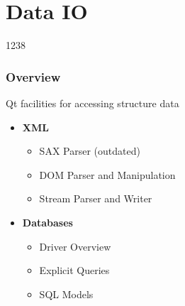 %
%
%
%

\section{Data IO}

\begin{slide}{1238}\label{xml-processing}
\frametitle{Overview}

Qt facilities for accessing structure data

\begin{itemize}
\item \textbf{XML}
  \begin{itemize}
  \item SAX Parser (outdated)
  \item DOM Parser and Manipulation
  \item Stream Parser and Writer
  \end{itemize}
\item \textbf{Databases}
  \begin{itemize}
  \item Driver Overview
  \item Explicit Queries
  \item SQL Models
  \end{itemize}
\end{itemize}
\end{slide}








